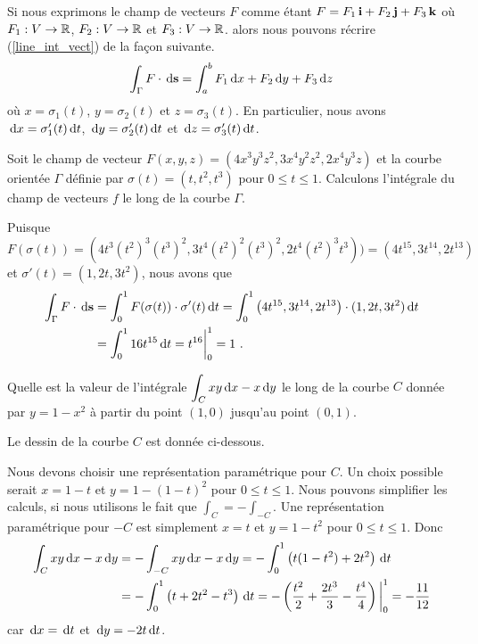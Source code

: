 {\begin{focus}{\dfn}
Si nous exprimons le champ de vecteurs $F$ comme étant
$F = F_1\,\mathbf{i} + F_2\,\mathbf{j} + F_3\,\mathbf{k}$ où $F_1:V\rightarrow \mathbb{R}$,
$F_2:V\rightarrow \mathbb{R}$ et $F_3:V\rightarrow \mathbb{R}$. alors nous pouvons récrire
(\ref{line_int_vect}) de la façon suivante.
\[
\int_\Gamma F \cdot \,\mathrm{d}\mathbf{s} = \int_a^b F_1\,\mathrm{d}x + F_2\,\mathrm{d}y +
F_3\,\mathrm{d}z
\]
où $x = \sigma_1(t)$, $y = \sigma_2(t)$ et $z=\sigma_3(t)$.  En
particulier, nous avons  $\,\mathrm{d}x = \sigma_1'(t) \,\mathrm{d}t$,
$\,\mathrm{d}y = \sigma_2'(t) \,\mathrm{d}t$ et $\,\mathrm{d}z = \sigma_3'(t) \,\mathrm{d}t$.
\end{focus}

\begin{egg}
Soit le champ de vecteur $F(x,y,z) = (4x^3y^3z^2,3x^4y^2z^2, 2x^4y^3z)$
et la courbe orientée $\Gamma$ définie par $\sigma(t) = (t,t^2,t^3)$ pour
$0\leq t \leq 1$.  Calculons l'intégrale du champ de vecteurs
$f$ le long de la courbe $\Gamma$.

Puisque
\[
F(\sigma(t)) = \left(4t^3 (t^2)^3 (t^3)^2,3t^4(t^2)^2(t^3)^2,
    2t^4(t^2)^3t^3\right))
= \left( 4t^{15} , 3t^{14} , 2t^{13}\right)
\]
et
$\sigma'(t) = (1, 2t, 3t^2)$, nous avons que
\begin{align*}
\int_{\Gamma} F \cdot \,\mathrm{d}\mathbf{s} &=
\int_0^1 F(\sigma(t)) \cdot \sigma'(t) \,\mathrm{d}t
= \int_0^1 \left( 4t^{15} , 3t^{14} , 2t^{13}\right)\cdot 
(1, 2t, 3t^2) \,\mathrm{d}t \\
& = \int_0^1 16 t^{15} \,\mathrm{d}t = t^{16}\bigg|_0^1 = 1 \ .
\end{align*}
\label{ICegg1}
\end{egg}

\begin{egg}
Quelle est la valeur de l'intégrale
$\displaystyle \int_C xy \,\mathrm{d}x - x \,\mathrm{d}y$ le long de la courbe $C$
donnée par $y=1-x^2$ à partir du point $(1,0)$ jusqu'au point $(0,1)$.

Le dessin de la courbe $C$ est donnée ci-dessous.

Nous devons choisir une représentation paramétrique pour $C$.  Un choix
possible serait $x=1-t$ et $y = 1-(1-t)^2$ pour $0 \leq t \leq 1$.
Nous pouvons simplifier les calculs, si nous utilisons le fait que
$\displaystyle \int_C = - \int_{-C}$.  Une représentation
paramétrique pour $-C$ est simplement $x=t$ et $y = 1-t^2$ pour
$0 \leq t \leq 1$.  Donc
\begin{align*}
\int_C xy \,\mathrm{d}x - x \,\mathrm{d}y &= -\int_{-C} xy \,\mathrm{d}x - x \,\mathrm{d}y
= - \int_0^1 \left( t(1-t^2) + 2t^2 \right) \,\mathrm{d}t \\
&= - \int_0^1 \left( t + 2t^2 - t^3\right) \,\mathrm{d}t
= - \left( \frac{t^2}{2} + \frac{2t^3}{3} - \frac{t^4}{4} \right)\bigg|_0^1
= -\frac{11}{12}
\end{align*}
car $\,\mathrm{d}x = \,\mathrm{d}t$ et $\,\mathrm{d}y = -2 t \,\mathrm{d}t$.
\end{egg}

}
